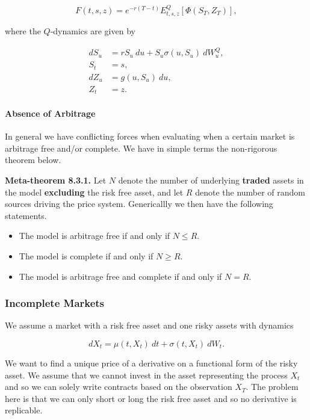 \documentclass[
]{article}
\providecommand{\tightlist}{%
  \setlength{\itemsep}{0pt}\setlength{\parskip}{0pt}}
\begin{document}
\[
F(t,s,z)=e^{-r(T-t)}E^Q_{t,s,z}[\Phi(S_T,Z_T)],
\]

where the \(Q\)-dynamics are given by

\begin{align*}
dS_u&=rS_u\ du + S_u\sigma(u,S_u)\ dW^Q_u,\\
S_t&=s,\\
dZ_u&=g(u,S_u)\ du,\\
Z_t&=z.
\end{align*}

\hypertarget{absence-of-arbitrage-1}{%
\paragraph{Absence of Arbitrage}\label{absence-of-arbitrage-1}}

In general we have conflicting forces when evaluating when a certain
market is arbitrage free and/or complete. We have in simple terms the
non-rigorous theorem below.

\textbf{Meta-theorem 8.3.1.} Let \(N\) denote the number of underlying
\textbf{traded} assets in the model \textbf{excluding} the risk free
asset, and let \(R\) denote the number of random sources driving the
price system. Genericallly we then have the following statements.

\begin{itemize}
\tightlist
\item
  The model is arbitrage free if and only if \(N\le R\).
\item
  The model is complete if and only if \(N\ge R\).
\item
  The model is arbitrage free and complete if and only if \(N=R\).
\end{itemize}

\hypertarget{incomplete-markets}{%
\subsubsection{Incomplete Markets}\label{incomplete-markets}}

We assume a market with a risk free asset and one risky assets with
dynamics

\[
dX_t=\mu(t,X_t)\ dt+\sigma(t,X_t)\ dW_t.
\]

We want to find a unique price of a derivative on a functional form of
the risky asset. We assume that we cannot invest in the asset
representing the process \(X_t\) and so we can solely write contracts
based on the observation \(X_T\). The problem here is that we can only
short or long the risk free asset and so no derivative is replicable.
\end{document}
